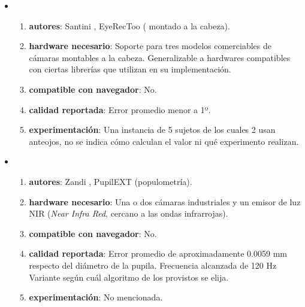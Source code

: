 \begin{itemize}

  \item \begin{enumerate}
    \item \textbf{autores}:
      Santini \etal, EyeRecToo \cite{santini_2017_eyerectoo} (\eyetracking
      montado a la cabeza).
    \item \textbf{hardware necesario}:
      Soporte para tres modelos comerciables de cámaras montables a la cabeza.
      Generalizable a hardwares compatibles con ciertas librerías que utilizan
      en su implementación.
    \item \textbf{compatible con navegador}:
      No.
    \item \textbf{calidad reportada}:
      Error promedio menor a 1º.
    \item \textbf{experimentación}:
      Una instancia de 5 sujetos de los cuales 2 usan anteojos, no se indica
      cómo calculan el valor ni qué experimento realizan.
  \end{enumerate}

  \item \begin{enumerate}
    \item \textbf{autores}:
      Zandi \etal, PupilEXT \cite{zandi_2021_pupilext} (populometría).
    \item \textbf{hardware necesario}:
      Una o dos cámaras industriales y un emisor de luz NIR (\textit{Near
      Infra Red}, cercano a las ondas infrarrojas).
    \item \textbf{compatible con navegador}:
      No.
    \item \textbf{calidad reportada}:
      Error promedio de aproximadamente 0.0059 mm respecto del diámetro de la
      pupila.
      Frecuencia alcanzada de 120 Hz
      Variante según cuál algoritmo de los provistos se elija.
    \item \textbf{experimentación}:
      No mencionada.
  \end{enumerate}


\end{itemize}
